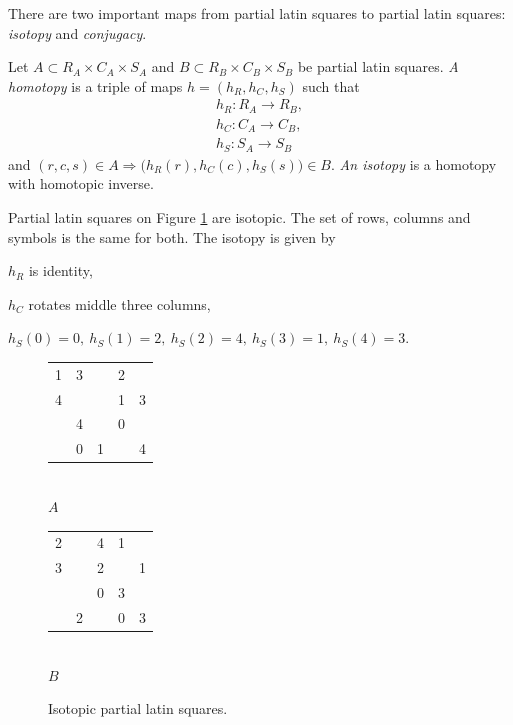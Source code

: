 There are two important maps from partial latin squares to partial latin squares: \emph{isotopy} and \emph{conjugacy}.

\begin{defn}
Let $A \subset R_A \times C_A \times S_A$ and $B \subset R_B \times C_B \times S_B$ be partial latin squares. \emph{A homotopy} is a triple of maps $h = (h_R, h_C, h_S)$ such that
\begin{eqnarray}
	h_R : R_A \rightarrow R_B, \nonumber \\
	h_C : C_A \rightarrow C_B, \nonumber \\
	h_S : S_A \rightarrow S_B\phantom{..} \nonumber
\end{eqnarray}
and $(r,c,s) \in A \Rightarrow \big(h_R(r), h_C(c), h_S(s)\big) \in B$. \emph{An isotopy} is a homotopy with homotopic inverse.
\end{defn}

\begin{exmp}
Partial latin squares on Figure \ref{fig:isotopic-pls} are isotopic. The set of rows, columns and symbols is the same for both. The isotopy is given by
\begin{cosyitemize}
	\item $h_R$ is identity,
	\item $h_C$ rotates middle three columns,
	\item $h_S(0) = 0,\ h_S(1) = 2,\ h_S(2) = 4,\ h_S(3) = 1,\ h_S(4) = 3$.
\end{cosyitemize}%

\begin{figure}[htb]
	\centering
	\begin{minipage}{.30\linewidth}
		\begin{center}
		\begin{tabular}{| c c c c c |}
			\hline
1 & 3 &   & 2 &   \\
4 &   &   & 1 & 3 \\
  & 4 &   & 0 &   \\
  & 0 & 1 &   & 4 \\
			\hline
		\end{tabular} \\
		\bigskip
		$A$
		\end{center}
	\end{minipage}
	\begin{minipage}{.30\linewidth}
		\begin{center}
		\begin{tabular}{| c c c c c |}
			\hline
2 &   & 4 & 1 &   \\
3 &   & 2 &   & 1 \\
  &   & 0 & 3 &   \\
  & 2 &   & 0 & 3 \\
			\hline
		\end{tabular} \\
		\bigskip
		$B$
		\end{center}
	\end{minipage}
	\label{fig:isotopic-pls}
	\caption{Isotopic partial latin squares.}
\end{figure}

\end{exmp}%

